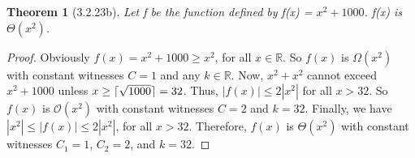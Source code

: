 \documentclass[a4paper, 12pt]{article}
\theoremstyle{plain}
\newtheorem*{theorem*}{Theorem}
\DeclarePairedDelimiter{\ceil}{\lceil}{\rceil}
\begin{document}
	
	\begin{theorem*}[3.2.23b]
		Let f be the function defined by f(x) = $x^2 + 1000$. \newline f(x) is $\Theta(x^2)$.
	\end{theorem*}
	
	\begin{proof}
		Obviously $f(x) = x^2 + 1000 \ge x^2$, for all $x \in \mathbb{R}$. So $f(x)$ is $\Omega(x^2)$ with constant witnesses $C = 1$ and any $k \in \mathbb{R}$. Now, $x^2 + x^2$ cannot exceed $x^2 + 1000$ unless $x \ge \ceil{\sqrt{1000}} = 32$. Thus, $|f(x)| \le 2|x^2|$ for all $x > 32$. So $f(x)$ is $\mathcal{O}(x^2)$ with constant witnesses $C = 2$ and $k = 32$. Finally, we have $|x^2| \le |f(x)| \le 2|x^2|$, for all $x > 32$. Therefore, $f(x)$ is $\Theta(x^2)$ with constant witnesses $C_1 = 1$, $C_2 = 2$, and $k = 32$.
	\end{proof}
\end{document}
